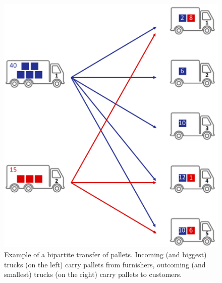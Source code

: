 \documentclass[preprint,12pt,authoryear]{elsarticle}
\begin{document}
\noindent 
\begin{figure}[h!]
\begin{minipage}{0.5\textwidth}
\centering
\includegraphics[scale=0.36]{images/fluxbiparti.png}
\end{minipage}
\begin{minipage}{0.5\textwidth}
\caption{Example of a bipartite transfer of pallets. Incoming (and biggest) trucks (on the left) carry pallets from furnishers, outcoming (and smallest) trucks (on the right) carry pallets to customers.}
\label{fig:fluxbiparti}
\end{minipage}
\end{figure}
\end{document}

